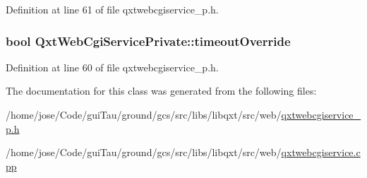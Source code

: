 Definition at line 61 of file qxtwebcgiservice\-\_\-p.\-h.

\hypertarget{class_qxt_web_cgi_service_private_a7ceac4c467fbff0f1a7f91434ad4b280}{
\subsubsection[{timeout\-Override}]{\setlength{\rightskip}{0pt plus 5cm}bool Qxt\-Web\-Cgi\-Service\-Private\-::timeout\-Override}}\label{class_qxt_web_cgi_service_private_a7ceac4c467fbff0f1a7f91434ad4b280}


Definition at line 60 of file qxtwebcgiservice\-\_\-p.\-h.



The documentation for this class was generated from the following files\-:\begin{DoxyCompactItemize}
\item 
/home/jose/\-Code/gui\-Tau/ground/gcs/src/libs/libqxt/src/web/\hyperlink{qxtwebcgiservice__p_8h}{qxtwebcgiservice\-\_\-p.\-h}\item 
/home/jose/\-Code/gui\-Tau/ground/gcs/src/libs/libqxt/src/web/\hyperlink{qxtwebcgiservice_8cpp}{qxtwebcgiservice.\-cpp}\end{DoxyCompactItemize}
